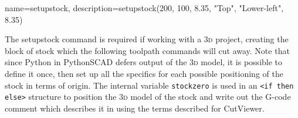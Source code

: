 \documentclass{ltxdoc}
\begin{document}
{
    name=setupstock, 
    description={setupstock(200, 100, 8.35, "Top", "Lower-left", 8.35)}
}

%    

\noindent The \gls{setupstock} command is required if working with a \textsc{3d} project, creating the block of stock which the following toolpath commands will cut away. Note that since Python in PythonSCAD defers output of the \textsc{3d} model, it is possible to define it once, then set up all the specifics for each possible positioning of the stock in terms of origin. The internal variable \verb|stockzero| is used in an \verb|<if then else>| structure to position the \textsc{3d} model of the stock and write out the G-code comment which describes it in using the terms described for CutViewer. 
\end{document}
